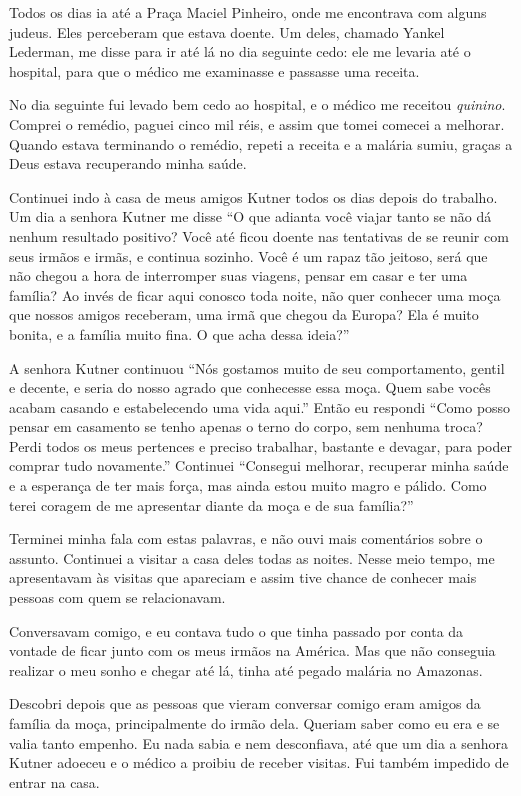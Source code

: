 Todos os dias ia até a Praça Maciel Pinheiro, onde me encontrava com
alguns judeus. Eles perceberam que estava doente. Um deles,
chamado Yankel Lederman, me disse para ir até lá no dia seguinte cedo: 
ele me levaria até o hospital, para que o médico me examinasse e passasse uma receita.

No dia seguinte fui levado bem cedo ao hospital, e o médico me
receitou \textit{quinino}. Comprei o remédio, paguei cinco mil réis, e assim que
tomei comecei a melhorar. Quando estava terminando o remédio,
repeti a receita e a malária sumiu, graças a Deus estava recuperando 
minha saúde.

Continuei indo à casa de meus amigos Kutner todos os dias depois do
trabalho. Um dia a senhora Kutner me disse ``O que adianta você viajar
tanto se não dá nenhum resultado positivo? Você até ficou doente
nas tentativas de se reunir com seus irmãos e irmãs, e continua
sozinho. Você é um rapaz tão jeitoso, será que não chegou a hora de interromper 
suas viagens, pensar em casar e ter uma família? Ao invés de ficar
aqui conosco toda noite, não quer conhecer uma moça que nossos amigos
receberam, uma irmã que chegou da Europa? Ela é muito bonita, e a família
muito fina. O que acha dessa ideia?''

A senhora Kutner continuou ``Nós gostamos muito de seu comportamento,
gentil e decente, e seria do nosso agrado que conhecesse essa moça.
Quem sabe vocês acabam casando e estabelecendo uma vida aqui.'' Então
eu respondi ``Como posso pensar em casamento se tenho apenas o
terno do corpo, sem nenhuma troca? Perdi todos os
meus pertences e preciso trabalhar, bastante e devagar, para poder comprar tudo novamente.'' Continuei ``Consegui melhorar, recuperar minha saúde e a esperança de ter mais força, mas ainda estou muito magro e
pálido. Como terei coragem de me apresentar diante da moça e de sua
família?''

Terminei minha fala com estas palavras, e não ouvi mais comentários sobre o assunto. 
Continuei a visitar a casa deles todas as
noites. Nesse meio tempo, me apresentavam às visitas que apareciam e assim
tive chance de conhecer mais pessoas com quem se relacionavam.

Conversavam comigo, e eu contava tudo o que tinha passado por conta da
vontade de ficar junto com os meus irmãos na América. Mas que não 
conseguia realizar o meu sonho e chegar até lá, tinha até 
pegado malária no Amazonas.

Descobri depois que as pessoas que vieram conversar comigo eram
amigos da família da moça, principalmente do irmão dela. Queriam saber
como eu era e se valia tanto empenho. Eu nada sabia e nem
desconfiava, até que um dia a senhora Kutner adoeceu e o médico a proibiu
de receber visitas. Fui também impedido de entrar na
casa.

